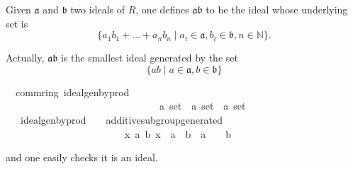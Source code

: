\documentclass[12pt]{scrartcl}
\begin{document}
Given $\mathfrak{a}$ and $\mathfrak{b}$ two ideals of $R$, one defines $\mathfrak{a} \mathfrak{b}$ to be the ideal whose underlying set is 
\[
	\lbrace a_1 b_1 + \dots + a_n b_n \mid a_i \in \mathfrak{a}, b_i \in \mathfrak{b}, n \in \mathbb{N} \rbrace.
\]

Actually, $\mathfrak{a} \mathfrak{b}$ is the smallest ideal generated by the set 
	\[
	\lbrace a b \mid a \in \mathfrak{a}, b \in \mathfrak{b} \rbrace
	\]
	

\begin{isabelle}
\isamarkupfalse%
\ {\isacharparenleft}{\kern0pt}\ comm{\isacharunderscore}{\kern0pt}ring{\isacharparenright}{\kern0pt}\ ideal{\isacharunderscore}{\kern0pt}gen{\isacharunderscore}{\kern0pt}by{\isacharunderscore}{\kern0pt}prod\ \isanewline
\ \ \ \ \ \ \ \ \ \ \ \ \ \ \ \ \ \ \ \ \ \ \ \ \ \ \ \ \ \ {\isacharcolon}{\kern0pt}{\isacharcolon}{\kern0pt}\ {\isachardoublequoteopen}{\isacharprime}{\kern0pt}a\ set\ {\isasymRightarrow}\ {\isacharprime}{\kern0pt}a\ set\ {\isasymRightarrow}\ {\isacharprime}{\kern0pt}a\ set{\isachardoublequoteclose}\isanewline
\ \ \ {\isachardoublequoteopen}ideal{\isacharunderscore}{\kern0pt}gen{\isacharunderscore}{\kern0pt}by{\isacharunderscore}{\kern0pt}prod\ {\isasymaa}\ {\isasymbb}\ {\isasymequiv}\ additive{\isachardot}{\kern0pt}subgroup{\isacharunderscore}{\kern0pt}generated\ \isanewline
\ \ \ \ \ \ \ \ \ \ \ \ \ \ \ \ \ \ \ \ \ \ \ \ {\isacharbraceleft}{\kern0pt}x{\isachardot}{\kern0pt}\ {\isasymexists}a\ b{\isachardot}{\kern0pt}\ x\ {\isacharequal}{\kern0pt}\ a\ {\isasymcdot}\ b\ {\isasymand}\ a\ {\isasymin}\ {\isasymaa}\ {\isasymand}\ b\ {\isasymin}\ {\isasymbb}{\isacharbraceright}{\kern0pt}{\isachardoublequoteclose}
\end{isabelle}

and one easily checks it is an ideal.

\end{document}
